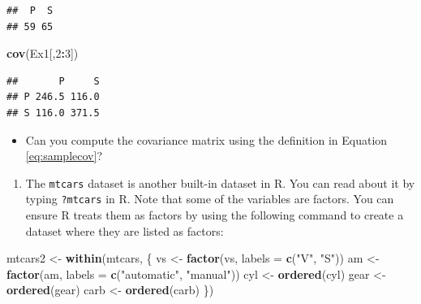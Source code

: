 \documentclass[
]{book}
\newenvironment{Shaded}{\begin{snugshade}}{\end{snugshade}}
\newcommand{\AttributeTok}[1]{\textcolor[rgb]{0.13,0.29,0.53}{#1}}
\newcommand{\DecValTok}[1]{\textcolor[rgb]{0.00,0.00,0.81}{#1}}
\newcommand{\FunctionTok}[1]{\textcolor[rgb]{0.13,0.29,0.53}{\textbf{#1}}}
\newcommand{\NormalTok}[1]{#1}
\newcommand{\OtherTok}[1]{\textcolor[rgb]{0.56,0.35,0.01}{#1}}
\newcommand{\SpecialCharTok}[1]{\textcolor[rgb]{0.81,0.36,0.00}{\textbf{#1}}}
\newcommand{\StringTok}[1]{\textcolor[rgb]{0.31,0.60,0.02}{#1}}
\providecommand{\tightlist}{%
  \setlength{\itemsep}{0pt}\setlength{\parskip}{0pt}}
\theoremstyle{definition}
\theoremstyle{definition}
\theoremstyle{definition}
\theoremstyle{definition}
\theoremstyle{remark}
\begin{document}
\begin{verbatim}
##  P  S 
## 59 65
\end{verbatim}

\begin{Shaded}
\begin{Highlighting}[]
\FunctionTok{cov}\NormalTok{(Ex1[,}\DecValTok{2}\SpecialCharTok{:}\DecValTok{3}\NormalTok{])}
\end{Highlighting}
\end{Shaded}

\begin{verbatim}
##       P     S
## P 246.5 116.0
## S 116.0 371.5
\end{verbatim}

\begin{itemize}
\tightlist
\item
  Can you compute the covariance matrix using the definition in Equation \eqref{eq:samplecov}?
\end{itemize}

\begin{enumerate}
\def\labelenumi{\arabic{enumi}.}
\setcounter{enumi}{2}
\tightlist
\item
  The \texttt{mtcars} dataset is another built-in dataset in R. You can read about it by typing \texttt{?mtcars} in R. Note that some of the variables are factors. You can ensure R treats them as factors by using the following command to create a dataset where they are listed as factors:
\end{enumerate}

\begin{Shaded}
\begin{Highlighting}[]
\NormalTok{mtcars2 }\OtherTok{\textless{}{-}} \FunctionTok{within}\NormalTok{(mtcars, \{}
\NormalTok{   vs }\OtherTok{\textless{}{-}} \FunctionTok{factor}\NormalTok{(vs, }\AttributeTok{labels =} \FunctionTok{c}\NormalTok{(}\StringTok{"V"}\NormalTok{, }\StringTok{"S"}\NormalTok{))}
\NormalTok{   am }\OtherTok{\textless{}{-}} \FunctionTok{factor}\NormalTok{(am, }\AttributeTok{labels =} \FunctionTok{c}\NormalTok{(}\StringTok{"automatic"}\NormalTok{, }\StringTok{"manual"}\NormalTok{))}
\NormalTok{   cyl  }\OtherTok{\textless{}{-}} \FunctionTok{ordered}\NormalTok{(cyl)}
\NormalTok{   gear }\OtherTok{\textless{}{-}} \FunctionTok{ordered}\NormalTok{(gear)}
\NormalTok{   carb }\OtherTok{\textless{}{-}} \FunctionTok{ordered}\NormalTok{(carb)}
\NormalTok{\})}
\end{Highlighting}
\end{Shaded}
\end{document}
